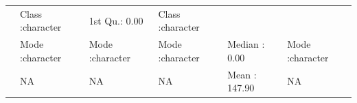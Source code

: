 \documentclass[]{article}
\begin{document}
\begin{longtable}[]{@{}llllll@{}}
\begin{minipage}[t]{0.16\columnwidth}
\end{minipage} & \begin{minipage}[t]{0.16\columnwidth}\raggedright\strut
Class :character\strut
\end{minipage} & \begin{minipage}[t]{0.16\columnwidth}\raggedright\strut
1st Qu.: 0.00\strut
\end{minipage} & \begin{minipage}[t]{0.16\columnwidth}\raggedright\strut
Class :character\strut
\end{minipage}\tabularnewline
\begin{minipage}[t]{0.04\columnwidth}\raggedright\strut
\strut
\end{minipage} & \begin{minipage}[t]{0.16\columnwidth}\raggedright\strut
Mode :character\strut
\end{minipage} & \begin{minipage}[t]{0.16\columnwidth}\raggedright\strut
Mode :character\strut
\end{minipage} & \begin{minipage}[t]{0.16\columnwidth}\raggedright\strut
Mode :character\strut
\end{minipage} & \begin{minipage}[t]{0.16\columnwidth}\raggedright\strut
Median : 0.00\strut
\end{minipage} & \begin{minipage}[t]{0.16\columnwidth}\raggedright\strut
Mode :character\strut
\end{minipage}\tabularnewline
\begin{minipage}[t]{0.04\columnwidth}\raggedright\strut
\strut
\end{minipage} & \begin{minipage}[t]{0.16\columnwidth}\raggedright\strut
NA\strut
\end{minipage} & \begin{minipage}[t]{0.16\columnwidth}\raggedright\strut
NA\strut
\end{minipage} & \begin{minipage}[t]{0.16\columnwidth}\raggedright\strut
NA\strut
\end{minipage} & \begin{minipage}[t]{0.16\columnwidth}\raggedright\strut
Mean : 147.90\strut
\end{minipage} & \begin{minipage}[t]{0.16\columnwidth}\raggedright\strut
NA\strut
\end{minipage}\tabularnewline

\end{longtable}
\end{document}
